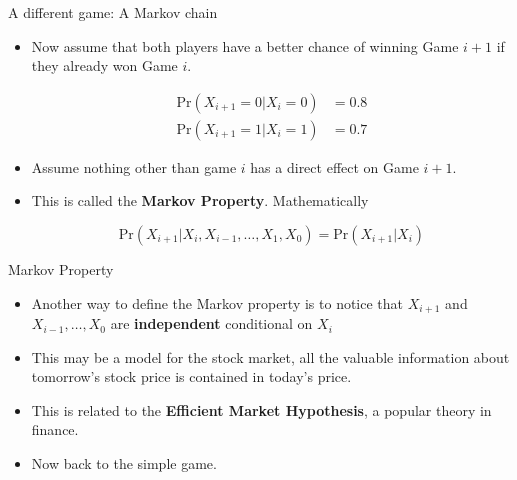\documentclass[10pt]{beamer}
\begin{document}
\begin{frame}{A different game: A Markov chain}
\begin{itemize}
\item Now assume that both players have a better chance of winning Game $i+1$ if they already won Game $i$.

\begin{align}
\mbox{Pr}(X_{i+1}=0|X_{i}=0)&=0.8\\
\mbox{Pr}(X_{i+1}=1|X_{i}=1)&=0.7
\end{align}

\item Assume nothing other than game $i$ has a direct effect on Game $i+1$.

\item This is called the {\bf Markov Property}. Mathematically

\begin{equation}
\mbox{Pr}(X_{i+1}|X_{i},X_{i-1},\ldots,X_{1},X_{0})=\mbox{Pr}(X_{i+1}|X_{i})
\end{equation}
\end{itemize}
\end{frame}
\begin{frame}{Markov Property}
\begin{itemize}
\item Another way to define the Markov property is to notice that $X_{i+1}$ and $X_{i-1},\ldots,X_{0}$ are {\bf independent} conditional on $X_{i}$

\item This may be a model for the stock market, all the valuable information about tomorrow's stock price is contained in today's price.

\item This is related to the {\bf Efficient Market Hypothesis}, a popular theory in finance.

\item Now back to the simple game.
\end{itemize}
\end{frame}
\end{document}
